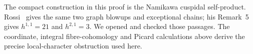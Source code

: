 The compact construction in this proof is the Namikawa
cuspidal self-product. Rossi~\cite[\S3, Proposition~4]{Rossi2017}
gives the same two graph blowups and exceptional chains;
his Remark~5 gives $h^{1,1}=21$ and $h^{2,1}=3$.
We opened and checked those passages. The coordinate,
integral fibre-cohomology and Picard calculations above
derive the precise local-character obstruction used here.



